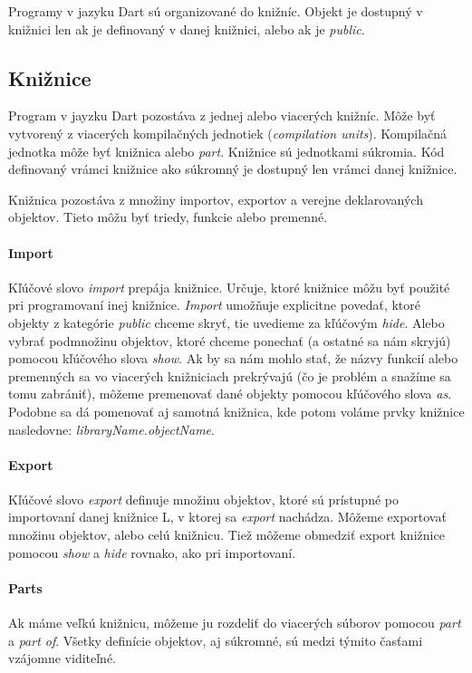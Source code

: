 Programy v jazyku Dart sú organizované do knižníc. Objekt je dostupný v knižnici len ak je definovaný v danej knižnici, alebo ak je \emph{public}.

\subsection{Knižnice}
Program v jayzku Dart pozostáva z jednej alebo viacerých knižníc. Môže byť vytvorený z viacerých kompilačných jednotiek (\emph{compilation units}). Kompilačná jednotka môže byť knižnica alebo \emph{part}.
Knižnice sú jednotkami súkromia. Kód definovaný vrámci knižnice ako súkromný je dostupný len vrámci danej knižnice.

Knižnica pozostáva z množiny importov, exportov a verejne deklarovaných objektov. Tieto môžu byť triedy, funkcie alebo premenné.

\paragraph{Import}
Kľúčové slovo \emph{import} prepája knižnice. Určuje, ktoré knižnice môžu byť použité pri programovaní inej knižnice. 
\emph{Import} umožňuje explicitne povedať, ktoré objekty z kategórie \emph{public} chceme skryť, tie uvedieme za kľúčovým \emph{hide}. 
Alebo vybrať podmnožinu objektov, ktoré chceme ponechať (a ostatné sa nám skryjú) pomocou kľúčového slova \emph{show}.
Ak by sa nám mohlo stať, že názvy funkcií alebo premenných sa vo viacerých knižniciach prekrývajú (čo je problém a snažíme sa tomu zabrániť), môžeme premenovať dané objekty pomocou kľúčového slova \emph{as}. 
Podobne sa dá pomenovať aj samotná knižnica, kde potom voláme prvky knižnice nasledovne: \emph{libraryName.objectName}.

\paragraph{Export}
Kľúčové slovo \emph{export} definuje množinu objektov, ktoré sú prístupné po importovaní danej knižnice L, v ktorej sa \emph{export} nachádza. 
Môžeme exportovať množinu objektov, alebo celú knižnicu. 
Tiež môžeme obmedziť export knižnice pomocou \emph{show} a \emph{hide} rovnako, ako pri importovaní.

\paragraph{Parts}
Ak máme veľkú knižnicu, môžeme ju rozdeliť do viacerých súborov pomocou \emph{part} a \emph{part of}. 
Všetky definície objektov, aj súkromné, sú medzi týmito časťami vzájomne viditeľné.

